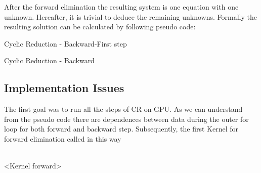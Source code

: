 After the forward elimination the resulting system is one equation with one unknown. Hereafter, it is trivial to deduce the remaining unknowns. Formally the resulting solution can be calculated by following pseudo code:
\begin{algorithm}[H]
\begin{algorithmic}[1]
\EndFunction
\end{algorithmic}
\caption{Cyclic Reduction - Backward-First step}
\label{alg:Backwardfirst_cr}
\end{algorithm}


\begin{algorithm}[H]
\begin{algorithmic}[1]
        	\State{\hspace*{2cm}\}}
        	\State{\}} 
\EndFunction
\end{algorithmic}
\caption{Cyclic Reduction - Backward}
\label{alg:Backward_cr}
\end{algorithm}


\subsection{Implementation Issues}


The first goal was to run all the steps of CR on GPU. As we can understand from the pseudo code there are dependences between data during the outer for loop for both forward and backward step. 
Subsequently, the first Kernel for forward elimination called in this way
\begin{algorithmic}
\\
 \hspace*{1cm}<Kernel forward>
\EndFor
\end{algorithmic}


